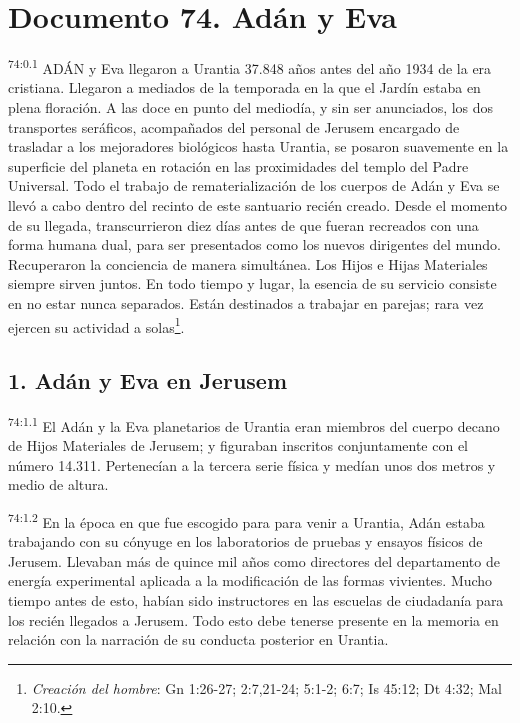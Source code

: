 \chapter{Documento 74. Adán y Eva}
\par
\textsuperscript{74:0.1} ADÁN y Eva llegaron a Urantia 37.848 años antes del año 1934 de la era cristiana. Llegaron a mediados de la temporada en la que el Jardín estaba en plena floración. A las doce en punto del mediodía, y sin ser anunciados, los dos transportes seráficos, acompañados del personal de Jerusem encargado de trasladar a los mejoradores biológicos hasta Urantia, se posaron suavemente en la superficie del planeta en rotación en las proximidades del templo del Padre Universal. Todo el trabajo de rematerialización de los cuerpos de Adán y Eva se llevó a cabo dentro del recinto de este santuario recién creado. Desde el momento de su llegada, transcurrieron diez días antes de que fueran recreados con una forma humana dual, para ser presentados como los nuevos dirigentes del mundo. Recuperaron la conciencia de manera simultánea. Los Hijos e Hijas Materiales siempre sirven juntos. En todo tiempo y lugar, la esencia de su servicio consiste en no estar nunca separados. Están destinados a trabajar en parejas; rara vez ejercen su actividad a solas\footnote{\textit{Creación del hombre}: Gn 1:26-27; 2:7,21-24; 5:1-2; 6:7; Is 45:12; Dt 4:32; Mal 2:10.}.

\section*{1. Adán y Eva en Jerusem}
\par
\textsuperscript{74:1.1} El Adán y la Eva planetarios de Urantia eran miembros del cuerpo decano de Hijos Materiales de Jerusem; y figuraban inscritos conjuntamente con el número 14.311. Pertenecían a la tercera serie física y medían unos dos metros y medio de altura.

\par
\textsuperscript{74:1.2} En la época en que fue escogido para para venir a Urantia, Adán estaba trabajando con su cónyuge en los laboratorios de pruebas y ensayos físicos de Jerusem. Llevaban más de quince mil años como directores del departamento de energía experimental aplicada a la modificación de las formas vivientes. Mucho tiempo antes de esto, habían sido instructores en las escuelas de ciudadanía para los recién llegados a Jerusem. Todo esto debe tenerse presente en la memoria en relación con la narración de su conducta posterior en Urantia.

